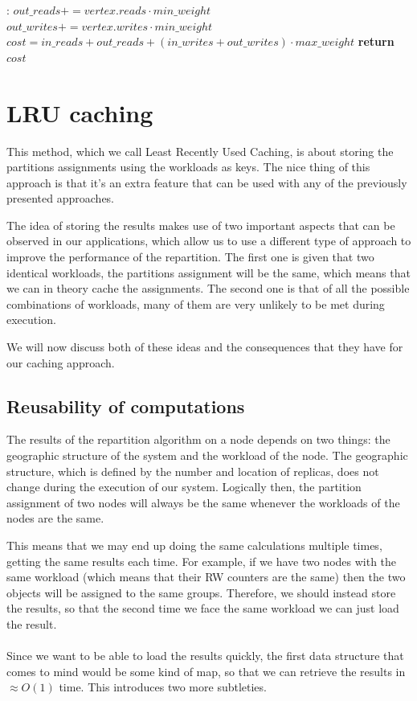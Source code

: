 	\begin{algorithm}
		\begin{algorithmic}[1]
        \Else:
          \State $out\_reads += vertex.reads \cdot min\_weight$
          \State $out\_writes += vertex.writes \cdot min\_weight$
        \EndIf
      \EndFor
      \State $cost = in\_reads+ out\_reads + (in\_writes+ out\_writes) \cdot max\_weight$
      \State \textbf{return} $cost$
  \EndFunction
  \end{algorithmic}
  \end{algorithm}

\section{LRU caching}\label{sec:lru-caching}
This method, which we call Least Recently Used Caching, is about storing the partitions assignments using the workloads as keys. The nice thing of this approach is that it's an extra feature that can be used with any of the previously presented approaches.

The idea of storing the results makes use of two important aspects that can be observed in our applications, which allow us to use a different type of approach to improve the performance of the repartition. The first one is given that two identical workloads, the partitions assignment will be the same, which means that we can in theory cache the assignments. The second one is that of all the possible combinations of workloads, many of them are very unlikely to be met during execution.

We will now discuss both of these ideas and the consequences that they have for our caching approach.

\subsection{Reusability of computations}\label{sec:Reusability-of-computations}
The results of the repartition algorithm on a node depends on two things: the geographic structure of the system and the workload of the node. The geographic structure, which is defined by the number and location of replicas, does not change during the execution of our system. Logically then, the partition assignment of two nodes will always be the same whenever the workloads of the nodes are the same.

This means that we may end up doing the same calculations multiple times, getting the same results each time. For example, if we have two nodes with the same workload (which means that their RW counters are the same) then the two objects will be assigned to the same groups. Therefore, we should instead store the results, so that the second time we face the same workload we can just load the result. 
\\\\
Since we want to be able to load the results quickly, the first data structure that comes to mind would be some kind of map, so that we can retrieve the results in $\approx O(1)$ time. This introduces two more subtleties.

